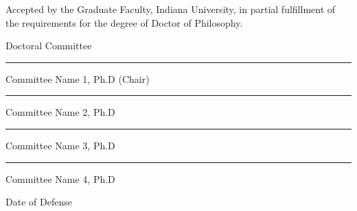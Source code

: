 \documentclass[12pt,letterpaper]{report}
\begin{document}

\addtocounter{page}{1}

\newpage
\begin{center}
\singlespacing
\vspace*{2cm}
{\large Accepted by the Graduate Faculty, Indiana University, in partial fulfillment of the requirements for the degree of Doctor of Philosophy.\par}
\vspace{2cm}
{\large Doctoral Committee \hfill}
\vspace{1cm}
\\
{\hfill \noindent\rule{8cm}{0.4pt} \par}
{\large \hfill Committee Name 1, Ph.D (Chair)}
\vspace{2cm}
\\
{\hfill \noindent\rule{8cm}{0.4pt} \par}
{\large \hfill Committee Name 2, Ph.D}
\vspace{2cm}
\\
{\hfill \noindent\rule{8cm}{0.4pt} \par}
{\large \hfill Committee Name 3, Ph.D}
\vspace{2cm}
\\
{\hfill \noindent\rule{8cm}{0.4pt} \par}
{\large \hfill Committee Name 4, Ph.D}
\vspace{2cm}
\end{center}
{\large Date of Defense \hfill}
\end{document}
